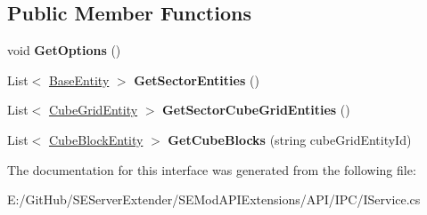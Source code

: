 \subsection*{Public Member Functions}
\begin{DoxyCompactItemize}
\item 
\hypertarget{interface_s_e_mod_a_p_i_extensions_1_1_a_p_i_1_1_i_p_c_1_1_i_web_service_contract_a9589fd9ac91768d982dfdc91d699875f}{}void {\bfseries Get\+Options} ()\label{interface_s_e_mod_a_p_i_extensions_1_1_a_p_i_1_1_i_p_c_1_1_i_web_service_contract_a9589fd9ac91768d982dfdc91d699875f}

\item 
\hypertarget{interface_s_e_mod_a_p_i_extensions_1_1_a_p_i_1_1_i_p_c_1_1_i_web_service_contract_a5f5c29cce81f765e44a961a9d1df2061}{}List$<$ \hyperlink{class_s_e_mod_a_p_i_internal_1_1_a_p_i_1_1_entity_1_1_base_entity}{Base\+Entity} $>$ {\bfseries Get\+Sector\+Entities} ()\label{interface_s_e_mod_a_p_i_extensions_1_1_a_p_i_1_1_i_p_c_1_1_i_web_service_contract_a5f5c29cce81f765e44a961a9d1df2061}

\item 
\hypertarget{interface_s_e_mod_a_p_i_extensions_1_1_a_p_i_1_1_i_p_c_1_1_i_web_service_contract_a2006b54f9bbc695bb9c0eea739f586ad}{}List$<$ \hyperlink{class_s_e_mod_a_p_i_internal_1_1_a_p_i_1_1_entity_1_1_sector_1_1_sector_object_1_1_cube_grid_entity}{Cube\+Grid\+Entity} $>$ {\bfseries Get\+Sector\+Cube\+Grid\+Entities} ()\label{interface_s_e_mod_a_p_i_extensions_1_1_a_p_i_1_1_i_p_c_1_1_i_web_service_contract_a2006b54f9bbc695bb9c0eea739f586ad}

\item 
\hypertarget{interface_s_e_mod_a_p_i_extensions_1_1_a_p_i_1_1_i_p_c_1_1_i_web_service_contract_a075ccba8062f80d60c74f7e2f5c41d9a}{}List$<$ \hyperlink{class_s_e_mod_a_p_i_internal_1_1_a_p_i_1_1_entity_1_1_sector_1_1_sector_object_1_1_cube_grid_1_1_cube_block_entity}{Cube\+Block\+Entity} $>$ {\bfseries Get\+Cube\+Blocks} (string cube\+Grid\+Entity\+Id)\label{interface_s_e_mod_a_p_i_extensions_1_1_a_p_i_1_1_i_p_c_1_1_i_web_service_contract_a075ccba8062f80d60c74f7e2f5c41d9a}

\end{DoxyCompactItemize}


The documentation for this interface was generated from the following file\+:\begin{DoxyCompactItemize}
\item 
E\+:/\+Git\+Hub/\+S\+E\+Server\+Extender/\+S\+E\+Mod\+A\+P\+I\+Extensions/\+A\+P\+I/\+I\+P\+C/I\+Service.\+cs\end{DoxyCompactItemize}
